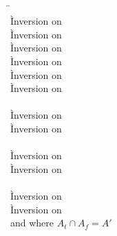 \begin{description}
\item[] \ \\
  \begin{tabbing}
  \hspace{3em} \= \hspace{3em} \= \\
    \` Inversion on  \\
    \` Inversion on  \\
    \` Inversion on  \\
    \` Inversion on  \\
    \` Inversion on  \\
    \` Inversion on  \\
  \\
    \` Inversion on  \\
    \` Inversion on  \\
   \\
    \` Inversion on  \\
    \` Inversion on  \\
   \\
    \` Inversion on  \\
    \` Inversion on  \\
   and  where $A_t \cap A_f = A'$ \\

\end{tabbing}
\end{description}
